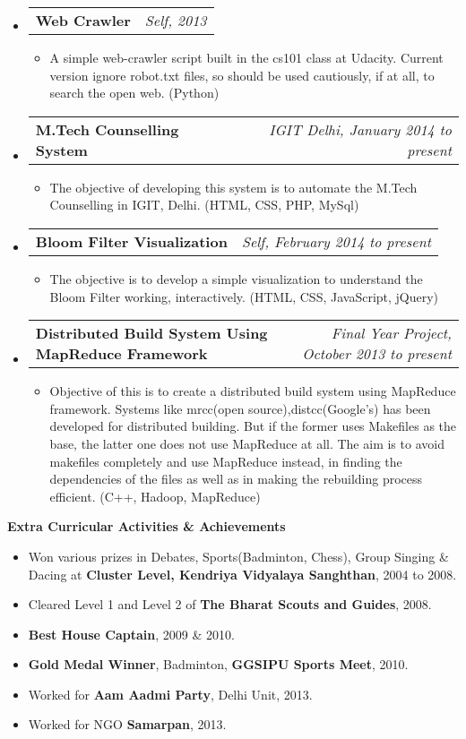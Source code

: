 \documentclass[letterpaper,10pt]{article}
\makeatletter
\newcommand{\resitem}[1]{\item #1 \vspace{-2pt}}
\newcommand{\resheading}[1]{{\large \colorbox{mygrey}{\begin{minipage}{\textwidth}{\textbf{#1 \vphantom{p\^{E}}}}\end{minipage}}}}
\newcommand{\ressubheading}[4]{
\begin{tabular*}{7.0in}{l@{\extracolsep{\fill}}r}
		\textbf{#1} & \textit{#4} \\
\end{tabular*}\vspace{-6pt}}
\makeatother
\begin{document}
\begin{itemize}
\item
	\ressubheading{Web Crawler}{Self}{Self}{Self, 2013}
	\begin{itemize}
		\resitem{A simple web-crawler script built in the cs101 class at Udacity. Current version ignore robot.txt files, so should be used cautiously, if at all, to search the open web.  (Python)}
	\end{itemize}


\item
	\ressubheading{M.Tech Counselling System}{Self}{Self}{IGIT Delhi, January 2014 to present}
	\begin{itemize}
		\resitem{The objective of developing this system is to automate the M.Tech Counselling in IGIT, Delhi. (HTML, CSS, PHP, MySql)}
	\end{itemize}


\item
	\ressubheading{Bloom Filter Visualization}{Self}{Self}{Self, February 2014 to present}
	\begin{itemize}
		\resitem{The objective is to develop a simple visualization to understand the Bloom Filter working, interactively. (HTML, CSS, JavaScript, jQuery)}
	\end{itemize}


\item
	\ressubheading{Distributed Build System Using MapReduce Framework}{Self}{Self}{Final Year Project, October 2013 to present}
	\begin{itemize}
		\resitem{Objective of this is to create a distributed build system using MapReduce framework. Systems like mrcc(open source),distcc(Google's) has been developed for distributed building. But if the former uses Makefiles as the base, the latter one does not use MapReduce at all. The aim is to avoid makefiles completely and use MapReduce instead, in finding the dependencies of the files as well as in making the rebuilding process efficient. (C++, Hadoop, MapReduce)}
	\end{itemize}

\end{itemize}

\resheading{Extra Curricular Activities \& Achievements}
\begin{itemize}
	\item Won various prizes in Debates, Sports(Badminton, Chess), Group Singing \& Dacing at \textbf{Cluster Level, Kendriya Vidyalaya Sanghthan}, 2004 to 2008. 
	\item Cleared Level 1 and Level 2 of \textbf{The Bharat Scouts and Guides}, 2008.
	\item \textbf{Best House Captain}, 2009 \& 2010.
	\item \textbf{Gold Medal Winner}, Badminton, \textbf{GGSIPU Sports Meet}, 2010.
	\item Worked for \textbf{Aam Aadmi Party}, Delhi Unit, 2013.
	\item Worked for NGO \textbf{Samarpan}, 2013.
	

\end{itemize}
\end{document}
